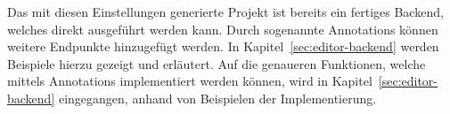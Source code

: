 Das mit diesen Einstellungen generierte Projekt ist bereits ein fertiges Backend, welches direkt ausgeführt werden kann.
Durch sogenannte Annotations können weitere Endpunkte hinzugefügt werden.
In Kapitel~\ref{sec:editor-backend} werden Beispiele hierzu gezeigt und erläutert.
Auf die genaueren Funktionen, welche mittels Annotations implementiert werden können, wird in Kapitel~\ref{sec:editor-backend} eingegangen, anhand von Beispielen der Implementierung.

